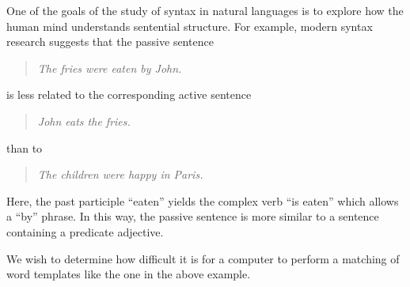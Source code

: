 
One of the goals of the study of syntax in natural languages is to explore how
the human mind understands sentential structure. For example, modern syntax
research suggests that the passive sentence
\begin{quote}
  \emph{The fries were eaten by John.}
\end{quote}
is less related to the corresponding active sentence
\begin{quote}
  \emph{John eats the fries.}
\end{quote}
than to
\begin{quote}
  \emph{The children were happy in Paris.}
\end{quote}
Here, the past participle ``eaten'' yields the complex verb ``is eaten'' which
allows a ``by'' phrase. In this way, the passive sentence is more similar to a
sentence containing a predicate adjective.

We wish to determine how difficult it is for a computer to perform a matching
of word templates like the one in the above example.

